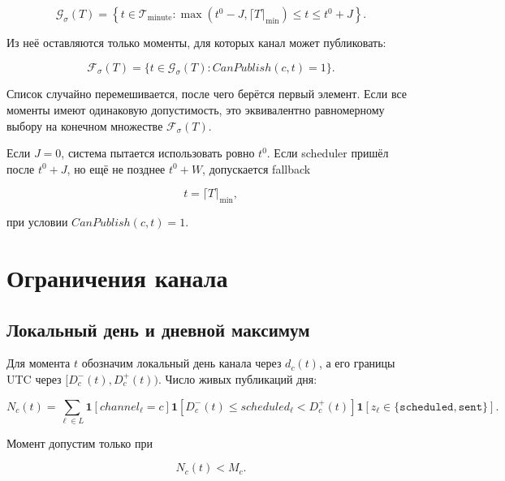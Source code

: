 \documentclass[12pt,a4paper]{article}
\newcommand{\Ind}{\mathbf{1}}
\newcommand{\Status}[1]{\texttt{#1}}
\begin{document}
\begin{equation}
  \mathcal{G}_\sigma(T)=
  \left\{
    t\in\mathcal{T}_{\mathrm{minute}}:
    \max(t^0-J,\lceil T\rceil_{\mathrm{min}})
    \leq t\leq t^0+J
  \right\}.
  \label{eq:jitter-grid}
\end{equation}

Из неё оставляются только моменты, для которых канал может публиковать:

\begin{equation}
  \mathcal{F}_\sigma(T)=
  \{t\in\mathcal{G}_\sigma(T):CanPublish(c,t)=1\}.
\end{equation}

Список случайно перемешивается, после чего берётся первый элемент. Если все
моменты имеют одинаковую допустимость, это эквивалентно равномерному выбору на
конечном множестве $\mathcal{F}_\sigma(T)$.

Если $J=0$, система пытается использовать ровно $t^0$. Если scheduler пришёл
после $t^0+J$, но ещё не позднее $t^0+W$, допускается fallback

\begin{equation}
  t=\lceil T\rceil_{\mathrm{min}},
\end{equation}

при условии $CanPublish(c,t)=1$.

\section{Ограничения канала}

\subsection{Локальный день и дневной максимум}

Для момента $t$ обозначим локальный день канала через $d_c(t)$, а его границы
UTC через $[D_c^-(t),D_c^+(t))$. Число живых публикаций дня:

\begin{equation}
  N_c(t)=
  \sum_{\ell\in L}
  \Ind[channel_\ell=c]
  \Ind[D_c^-(t)\leq scheduled_\ell<D_c^+(t)]
  \Ind[z_\ell\in\{\Status{scheduled},\Status{sent}\}].
  \label{eq:posts-today}
\end{equation}

Момент допустим только при

\begin{equation}
  N_c(t)<M_c.
  \label{eq:max-posts-constraint}
\end{equation}
\end{document}
